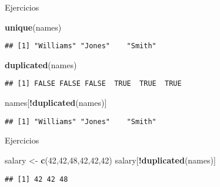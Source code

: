 \documentclass[ignorenonframetext,]{beamer}
\newenvironment{Shaded}{\begin{snugshade}}{\end{snugshade}}
\newcommand{\KeywordTok}[1]{\textcolor[rgb]{0.13,0.29,0.53}{\textbf{#1}}}
\newcommand{\DecValTok}[1]{\textcolor[rgb]{0.00,0.00,0.81}{#1}}
\newcommand{\StringTok}[1]{\textcolor[rgb]{0.31,0.60,0.02}{#1}}
\newcommand{\OperatorTok}[1]{\textcolor[rgb]{0.81,0.36,0.00}{\textbf{#1}}}
\newcommand{\NormalTok}[1]{#1}
\begin{document}
\begin{frame}[fragile]{Ejercicios}

\begin{Shaded}
\begin{Highlighting}[]
\KeywordTok{unique}\NormalTok{(names)}
\end{Highlighting}
\end{Shaded}
\pause
\begin{verbatim}
## [1] "Williams" "Jones"    "Smith"
\end{verbatim}

\begin{Shaded}
\begin{Highlighting}[]
\KeywordTok{duplicated}\NormalTok{(names)}
\end{Highlighting}
\end{Shaded}
\pause
\begin{verbatim}
## [1] FALSE FALSE FALSE  TRUE  TRUE  TRUE
\end{verbatim}

\begin{Shaded}
\begin{Highlighting}[]
\NormalTok{names[}\OperatorTok{!}\KeywordTok{duplicated}\NormalTok{(names)]}
\end{Highlighting}
\end{Shaded}
\pause
\begin{verbatim}
## [1] "Williams" "Jones"    "Smith"
\end{verbatim}

\end{frame}

\begin{frame}[fragile]{Ejercicios}

\begin{Shaded}
\begin{Highlighting}[]
\NormalTok{salary <-}\StringTok{ }\KeywordTok{c}\NormalTok{(}\DecValTok{42}\NormalTok{,}\DecValTok{42}\NormalTok{,}\DecValTok{48}\NormalTok{,}\DecValTok{42}\NormalTok{,}\DecValTok{42}\NormalTok{,}\DecValTok{42}\NormalTok{)}
\NormalTok{salary[}\OperatorTok{!}\KeywordTok{duplicated}\NormalTok{(names)]}
\end{Highlighting}
\end{Shaded}
\pause
\begin{verbatim}
## [1] 42 42 48
\end{verbatim}

\end{frame}
\end{document}
